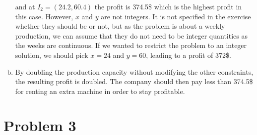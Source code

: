 \documentclass[a4paper, 10pt, twoside]{article}
\begin{document}
\begin{enumerate}[a)]
          and at $I_2 = (24.2, 60.4)$ the profit is 374.5\$ which is the highest profit in this case. However, $x$ and $y$ are not integers. It is not specified in the exercise whether they should be or not, but as the problem is about a weekly production, we can assume that they do not need to be integer quantities as the weeks are continuous. If we wanted to restrict the problem to an integer solution, we should pick $x = 24$ and $y = 60$, leading to a profit of 372\$.

    \item By doubling the production capacity without modifying the other constraints, the resulting profit is doubled. The company should then pay less than 374.5\$ for renting an extra machine in order to stay profitable.
\end{enumerate}

\section*{Problem 3}
\end{document}
